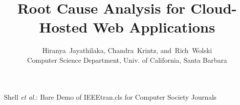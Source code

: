 \documentclass[10pt,journal,compsoc]{IEEEtran}
\begin{document}




%

\title{\LARGE Root Cause Analysis for Cloud-Hosted Web Applications}
\author{Hiranya~Jayathilaka,
        Chandra~Krintz,
        and~Rich~Wolski\\
Computer Science Department, Univ. of California, Santa Barbara}

%                                                                                                         
{Shell \MakeLowercase{\textit{et al.}}: Bare Demo of IEEEtran.cls for Computer Society Journals}

\end{document}
